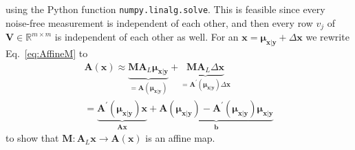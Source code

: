 using the Python function \texttt{numpy.linalg.solve}.
This is feasible since every noise-free measurement is independent of each other, and then every row $v_j$ of $\bm{V} \in \mathbb{R}^{m \times m}$ is independent of each other as well.
For an $\bm{x} = \bm{\mu}_{\bm{x}|\bm{y}} + \Delta \bm{x}$ we rewrite Eq.~\ref{eq:AffineM} to
\begin{align}
	\bm{A}(\bm{x})  \approx \underbrace{  \bm{M A}_L  \bm{\mu}_{\bm{x}|\bm{y}} }_{= \bm{A}( \bm{\mu}_{\bm{x}|\bm{y}} )  }+  \underbrace{\bm{M A}_L  \Delta \bm{x} }_{= \bm{A}^{\prime}( \bm{\mu}_{\bm{x}|\bm{y}} )  \Delta \bm{x} }\, \\
	=    \underbrace{ \bm{A}^{\prime}( \bm{\mu}_{\bm{x}|\bm{y}} ) \bm{x}}_{ \bm{A}\bm{x}}  +  \underbrace{ \bm{A}( \bm{\mu}_{\bm{x}|\bm{y}} )  - \bm{A}^{\prime}( \bm{\mu}_{\bm{x}|\bm{y}} ) \bm{\mu}_{\bm{x}|\bm{y}}}_{  \bm{b}}
\end{align}
to show that $ \bm{M}:\bm{A}_L\bm{x} \rightarrow \bm{A}(\bm{x})$ is an affine map.










